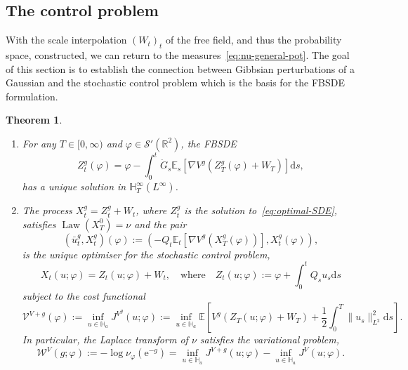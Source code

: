 \documentclass[11pt, a4paper]{scrartcl}
\numberwithin{equation}{section}
\theoremstyle{plain}
\newtheorem{theorem}[foo]{Theorem}
\theoremstyle{remark}
\newcommand{\assign}{:=}
\newcommand{\mathd}{\mathrm{d}}
\newcommand{\mathe}{\mathrm{e}}
\newcommand{\tmdummy}{$\mbox{}$}
\newcommand{\tmop}[1]{\ensuremath{\operatorname{#1}}}
\newenvironment{enumeratealpha}{\begin{enumerate}[a{\textup{)}}] }{\end{enumerate}}
\begin{document}
\subsection{The control problem}

With the scale interpolation $(W_t)_t$ of the free field, and thus the
probability space, constructed, we can return to the
measures~\eqref{eq:nu-general-pot}. The goal of this section is to establish
the connection between Gibbsian perturbations of a Gaussian and the stochastic
control problem which is the basis for the FBSDE formulation.
\begin{theorem}
  \label{thm:ctrl-FBSDE}{\tmdummy}
  \begin{enumeratealpha}
    \item  \label{prop:optimal-SDE}For any $T \in [0, \infty)$ and $\varphi
    \in \mathcal{S}' (\mathbb{R}^2)$, the FBSDE
    \begin{equation}
      Z^g_t (\varphi) = \varphi - \int_0^t \dot{G}_s \mathbb{E}_s [\nabla V^g
      (Z^g_T (\varphi) + W_T)] \mathd s, \label{eq:optimal-SDE}
    \end{equation}
    has a unique solution in $\mathbb{H}^{\infty}_T (L^{\infty})$.
    
    \item \label{thm:ctrl-form}The process $X^g_t = Z_t^g + W_t$, where
    $Z_t^g$ is the solution to~\eqref{eq:optimal-SDE}, satisfies $\tmop{Law}
    (X_T^0) = \nu$ and the pair
    \begin{equation}
      (\bar{u}^g_t, X_t^g) (\varphi) \assign (- Q_t \mathbb{E}_t [\nabla V^g
      (X_T^g (\varphi))], X_t^g (\varphi)), \label{eq:optimal-pair}
    \end{equation}
    is the unique optimiser for the stochastic control problem,
    \begin{equation}
      X_t (u ; \varphi) = Z_t (u ; \varphi) + W_t, \quad \text{where} \quad
      Z_t (u ; \varphi) \assign \varphi + \int_0^t Q_s u_s \mathd s
      \label{eq:ctrl-process}
    \end{equation}
    subject to the cost functional
    \begin{equation}
      \mathcal{V}^{V + g} (\varphi) \assign \inf_{u \in \mathbb{H}_a} J^{V^g}
      (u ; \varphi) \assign \inf_{u \in \mathbb{H}_a} \mathbb{E} \left[ V^g
      (Z_T (u ; \varphi) + W_T) + \frac{1}{2} \int_0^T \| u_s \|^2_{L^2}
      \mathd s \right] . \label{eq:def-value-func}
    \end{equation}
    In particular, the Laplace transform of $\nu$ satisfies the variational
    problem,
    \begin{equation}
      \mathcal{W}^V (g ; \varphi) \assign - \log \nu_{\varphi} (\mathe^{- g})
      = \inf_{u \in \mathbb{H}_a} J^{V + g} (u ; \varphi) - \inf_{u \in
      \mathbb{H}_a} J^V (u ; \varphi) . \label{eq:def-Wf}
    \end{equation}
  \end{enumeratealpha}
\end{theorem}
\end{document}

